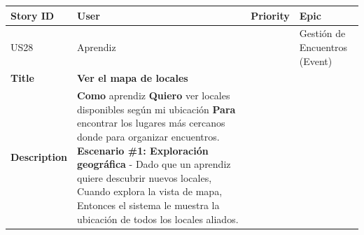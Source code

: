 {\def\LTcaptype{none} %
\begin{longtable}[]{@{}
  >{\raggedright\arraybackslash}p{}
  >{\raggedright\arraybackslash}p{}
  >{\raggedright\arraybackslash}p{}
  >{\raggedright\arraybackslash}p{}@{}}
\toprule\noalign{}
\begin{minipage}[b]{\linewidth}\raggedright
Story ID
\end{minipage} & \begin{minipage}[b]{\linewidth}\raggedright
User
\end{minipage} & \begin{minipage}[b]{\linewidth}\raggedright
Priority
\end{minipage} & \begin{minipage}[b]{\linewidth}\raggedright
Epic
\end{minipage} \\
\midrule\noalign{}
\endhead
\bottomrule\noalign{}
\endlastfoot
US28 & Aprendiz & 5 & Gestión de Encuentros (Event) \\
\textbf{Title} & \textbf{Ver el mapa de locales} & & \\
\textbf{Description} & \textbf{Como} aprendiz \textbf{Quiero} ver
locales disponibles según mi ubicación \textbf{Para} encontrar los
lugares más cercanos donde para organizar encuentros. \textbf{Escenario
\#1: Exploración geográfica} - Dado que un aprendiz quiere descubrir
nuevos locales, Cuando explora la vista de mapa, Entonces el sistema le
muestra la ubicación de todos los locales aliados. & & \\
\end{longtable}
}

